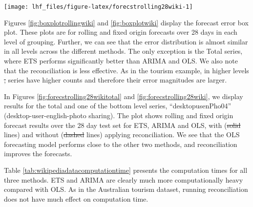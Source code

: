 \documentclass[11pt,a4paper,]{article}
\let\origfigure\figure
\let\endorigfigure\endfigure
\renewenvironment{figure}[1][2] {
    \expandafter\origfigure\expandafter[!htbp]
} {
    \endorigfigure
}
\providecommand{\DIFaddtex}[1]{{\protect\color{blue}\uwave{#1}}} %
\providecommand{\DIFdeltex}[1]{{\protect\color{red}\sout{#1}}}                      %
\providecommand{\DIFaddbegin}{} %
\providecommand{\DIFaddend}{} %
\providecommand{\DIFdelbegin}{} %
\providecommand{\DIFdelend}{} %
\providecommand{\DIFadd}[1]{\texorpdfstring{\DIFaddtex{#1}}{#1}} %
\providecommand{\DIFdel}[1]{\texorpdfstring{\DIFdeltex{#1}}{}} %
\newcommand{\DIFscaledelfig}{0.5}
\newlength{\DIFdelgraphicswidth} %
\newlength{\DIFdelgraphicsheight} %
\newcommand{\DIFaddincludegraphics}[2][]{{\color{blue}\fbox{\DIFOincludegraphics[#1]{#2}}}} %
\newcommand{\DIFdelincludegraphics}[2][]{%
\sbox{\DIFdelgraphicsbox}{\DIFOincludegraphics[#1]{#2}}%
\settoboxwidth{\DIFdelgraphicswidth}{\DIFdelgraphicsbox} %
\settoboxtotalheight{\DIFdelgraphicsheight}{\DIFdelgraphicsbox} %
\scalebox{\DIFscaledelfig}{%
\parbox[b]{\DIFdelgraphicswidth}{\usebox{\DIFdelgraphicsbox}\\[-\baselineskip] \rule{\DIFdelgraphicswidth}{0em}}\llap{\resizebox{\DIFdelgraphicswidth}{\DIFdelgraphicsheight}{%
\setlength{\unitlength}{\DIFdelgraphicswidth}%
\begin{picture}(1,1)%
\thicklines\linethickness{2pt} %
{\color[rgb]{1,0,0}\put(0,0){\framebox(1,1){}}}%
{\color[rgb]{1,0,0}\put(0,0){\line( 1,1){1}}}%
{\color[rgb]{1,0,0}\put(0,1){\line(1,-1){1}}}%
\end{picture}%
}\hspace*{3pt}}} %
} %
\DeclareRobustCommand{\DIFaddbegin}{\DIFOaddbegin \let\includegraphics\DIFaddincludegraphics} %
\DeclareRobustCommand{\DIFaddend}{\DIFOaddend \let\includegraphics\DIFOincludegraphics} %
\DeclareRobustCommand{\DIFdelbegin}{\DIFOdelbegin \let\includegraphics\DIFdelincludegraphics} %
\DeclareRobustCommand{\DIFdelend}{\DIFOaddend \let\includegraphics\DIFOincludegraphics} %
\begin{document}
\begin{figure}

{\centering \texttt{[image: lhf\_files/figure-latex/forecstrolling28wiki-1]}

}

\caption{The actual test set for the 'desktopusenPho04' bottom level series compared to the forecasts from reconciled and unreconciled ETS, ARIMA and OLS methods for rolling and fixed origin forecasts of Wikipedia pageviews.}\label{fig:forecstrolling28wiki}
\end{figure}

Figures \ref{fig:boxplotrollingwiki} and \ref{fig:boxplotwiki} display the forecast error box plot. These plots are for rolling and fixed origin forecasts over 28 days in each level of grouping. Further, we can see that the error distribution is almost similar in all levels across the different methods. The only exception is the Total series, where ETS performs significantly better than ARIMA and OLS. We also note that the reconciliation is less effective. As in the tourism example, in higher levels \DIFdelbegin \DIFdel{, }\DIFdelend series have higher counts and therefore their error magnitudes are larger.

In Figures \ref{fig:forecstrolling28wikitotal} and \ref{fig:forecstrolling28wiki}, we display results for the total and one of the bottom level series, ``desktopusenPho04'' (desktop-user-english-photo sharing). The plot shows rolling and fixed origin forecast results over the 28 day test set for ETS, ARIMA and OLS, with (\DIFdelbegin \DIFdel{solid }\DIFdelend \DIFaddbegin \DIFadd{dashed }\DIFaddend lines) and without (\DIFdelbegin \DIFdel{dashed }\DIFdelend \DIFaddbegin \DIFadd{dotted }\DIFaddend lines) applying reconciliation. We see that the OLS forecasting model performs close to the other two methods, and reconciliation improves the forecasts.

Table \ref{tab:wikipediadatacomputationtime} presents the computation times for all three methods. ETS and ARIMA are clearly much more computationally heavy compared with OLS. As in the Australian tourism dataset, running reconciliation does not have much effect on computation time.
\end{document}
